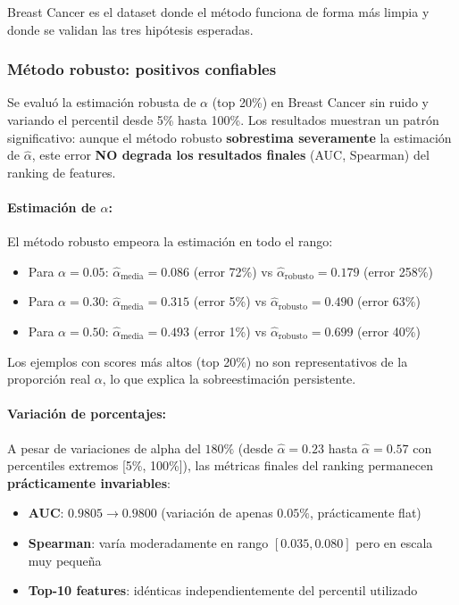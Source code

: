 \documentclass[a4paper,11pt]{article}
\begin{document}
Breast Cancer es el dataset donde el método funciona de forma más limpia y donde se validan las tres hipótesis esperadas.

\subsubsection{Método robusto: positivos confiables}

Se evaluó la estimación robusta de $\alpha$ (top 20\%) en Breast Cancer sin ruido y variando el percentil desde 5\% hasta 100\%. Los resultados muestran un patrón significativo: aunque el método robusto \textbf{sobrestima severamente} la estimación de $\hat{\alpha}$, este error \textbf{NO degrada los resultados finales} (AUC, Spearman) del ranking de features.

\paragraph{Estimación de $\alpha$:} El método robusto empeora la estimación en todo el rango:
\begin{itemize}
    \item Para $\alpha = 0.05$: $\hat{\alpha}_{\text{media}} = 0.086$ (error 72\%) vs $\hat{\alpha}_{\text{robusto}} = 0.179$ (error 258\%)
    \item Para $\alpha = 0.30$: $\hat{\alpha}_{\text{media}} = 0.315$ (error 5\%) vs $\hat{\alpha}_{\text{robusto}} = 0.490$ (error 63\%)
    \item Para $\alpha = 0.50$: $\hat{\alpha}_{\text{media}} = 0.493$ (error 1\%) vs $\hat{\alpha}_{\text{robusto}} = 0.699$ (error 40\%)
\end{itemize}

Los ejemplos con scores más altos (top 20\%) no son representativos de la proporción real $\alpha$, lo que explica la sobreestimación persistente.

\paragraph{Variación de porcentajes:} A pesar de variaciones de alpha del $180\%$ (desde $\hat{\alpha}=0.23$ hasta $\hat{\alpha}=0.57$ con percentiles extremos [5\%, 100\%]), las métricas finales del ranking permanecen \textbf{prácticamente invariables}:

\begin{itemize}
    \item \textbf{AUC}: $0.9805 \to 0.9800$ (variación de apenas $\mathbf{0.05\%}$, prácticamente flat)
    \item \textbf{Spearman}: varía moderadamente en rango $[0.035, 0.080]$ pero en escala muy pequeña
    \item \textbf{Top-10 features}: idénticas independientemente del percentil utilizado
\end{itemize}
\end{document}
